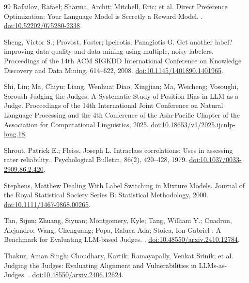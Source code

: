 \begin{thebibliography}{99}
Rafailov, Rafael; Sharma, Archit; Mitchell, Eric; et al.
\newblock Direct Preference Optimization: Your Language Model is Secretly a Reward Model.
. \href{https://doi.org/10.52202/075280-2338}{doi:10.52202/075280-2338}.

Sheng, Victor S.; Provost, Foster; Ipeirotis, Panagiotis G.
\newblock Get another label? improving data quality and data mining using multiple, noisy labelers.
\newblock Proceedings of the 14th ACM SIGKDD International Conference on Knowledge Discovery and Data Mining, 614--622, 2008. \href{https://doi.org/10.1145/1401890.1401965}{doi:10.1145/1401890.1401965}.

Shi, Lin; Ma, Chiyu; Liang, Wenhua; Diao, Xingjian; Ma, Weicheng; Vosoughi, Soroush
\newblock Judging the Judges: A Systematic Study of Position Bias in {LLM-as-a-Judge}.
\newblock Proceedings of the 14th International Joint Conference on Natural Language Processing and the 4th Conference of the Asia-Pacific Chapter of the Association for Computational Linguistics, 2025. \href{https://doi.org/10.18653/v1/2025.ijcnlp-long.18}{doi:10.18653/v1/2025.ijcnlp-long.18}.

Shrout, Patrick E.; Fleiss, Joseph L.
\newblock Intraclass correlations: Uses in assessing rater reliability..
\newblock Psychological Bulletin, 86(2), 420--428, 1979. \href{https://doi.org/10.1037/0033-2909.86.2.420}{doi:10.1037/0033-2909.86.2.420}.

Stephens, Matthew
\newblock Dealing With Label Switching in Mixture Models.
\newblock Journal of the Royal Statistical Society Series B: Statistical Methodology, 2000. \href{https://doi.org/10.1111/1467-9868.00265}{doi:10.1111/1467-9868.00265}.

Tan, Sijun; Zhuang, Siyuan; Montgomery, Kyle; Tang, William Y.; Cuadron, Alejandro; Wang, Chenguang; Popa, Raluca Ada; Stoica, Ion Gabriel
: A Benchmark for Evaluating {LLM}-based Judges.
. \href{https://doi.org/10.48550/arxiv.2410.12784}{doi:10.48550/arxiv.2410.12784}.

Thakur, Aman Singh; Choudhary, Kartik; Ramayapally, Venkat Srinik; et al.
\newblock Judging the Judges: Evaluating Alignment and Vulnerabilities in {LLM}s-as-Judges.
. \href{https://doi.org/10.48550/arxiv.2406.12624}{doi:10.48550/arxiv.2406.12624}.


\end{thebibliography}
